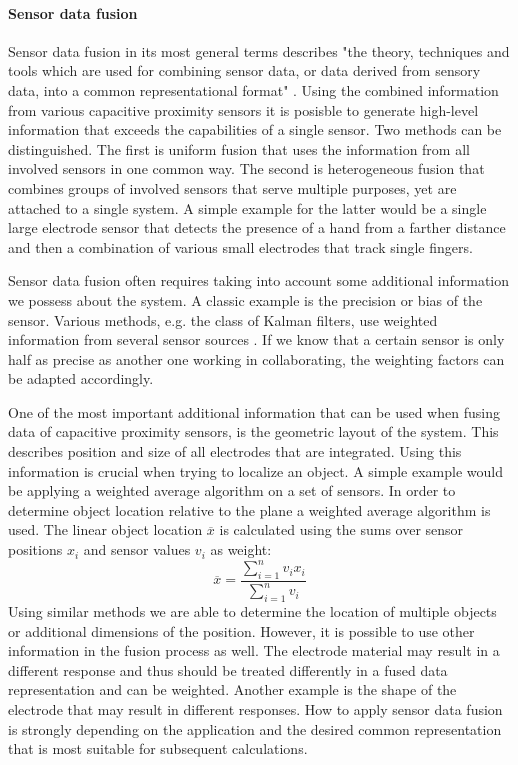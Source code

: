 \paragraph{Sensor data fusion}
Sensor data fusion in its most general terms describes "the theory, techniques and tools which are used for combining sensor data, or data derived from sensory data, into a common representational format" \cite{mitchell2007introduction}. Using the combined information from various capacitive proximity sensors it is posisble to generate high-level information that exceeds the capabilities of a single sensor. Two methods can be  distinguished. The first is uniform fusion that uses the information from all involved sensors in one common way. The second is heterogeneous fusion that combines groups of involved sensors that serve multiple purposes, yet are attached to a single system. A simple example for the latter would be a single large electrode sensor that detects the presence of a hand from a farther distance and then a combination of various small electrodes that track single fingers. 

Sensor data fusion often requires taking into account some additional information we possess about the system. A classic example is the precision or bias of the sensor. Various methods, e.g. the class of Kalman filters, use weighted information from several sensor sources \cite{welch1995introduction}. If we know that a certain sensor is only half as precise as another one working in collaborating, the weighting factors can be adapted accordingly. 

One of the most important additional information that can be used when fusing data of capacitive proximity sensors, is the geometric layout of the system. This describes position and size of all electrodes that are integrated. Using this information is crucial when trying to localize an object. A simple example would be applying a weighted average algorithm on a set of sensors. In order to determine object location relative to the plane a weighted average algorithm is used. The linear object location $\overline{x}$ is calculated using the sums over sensor positions $x_i$ and sensor values $v_i$ as weight:
\begin{equation}
\overline{x}=\frac{\sum^n_{i=1}{v_i x_i}}{\sum^n_{i=1}{v_i}}
\end{equation}
Using similar methods we are able to determine the location of multiple objects or additional dimensions of the position. However, it is possible to use other information in the fusion process as well. The electrode material may result in a different response and thus should be treated differently in a fused data representation and can be weighted. Another example is the shape of the electrode that may result in different responses. How to apply sensor data fusion is strongly depending on the application and the desired common representation that is most suitable for subsequent calculations.

